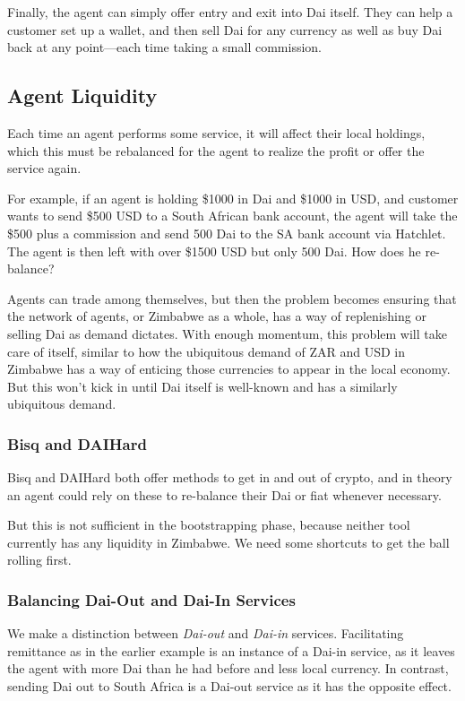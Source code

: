 \documentclass{article}
\begin{document}
Finally, the agent can simply offer entry and exit into Dai itself. They can help a customer set up a wallet, and then sell Dai for any currency as well as buy Dai back at any point---each time taking a small commission.

\subsection{Agent Liquidity} \label{liquidity}

Each time an agent performs some service, it will affect their local holdings, which this must be rebalanced for the agent to realize the profit or offer the service again.

For example, if an agent is holding \$1000 in Dai and \$1000 in USD, and customer wants to send \$500 USD to a South African bank account, the agent will take the \$500 plus a commission and send 500 Dai to the SA bank account via Hatchlet. The agent is then left with over \$1500 USD but only 500 Dai. How does he re-balance?

Agents can trade among themselves, but then the problem becomes ensuring that the network of agents, or Zimbabwe as a whole, has a way of replenishing or selling Dai as demand dictates. With enough momentum, this problem will take care of itself, similar to how the ubiquitous demand of ZAR and USD in Zimbabwe has a way of enticing those currencies to appear in the local economy. But this won't kick in until Dai itself is well-known and has a similarly ubiquitous demand.

\subsubsection{Bisq and DAIHard} \label{exchanges insufficient}

Bisq and DAIHard both offer methods to get in and out of crypto, and in theory an agent could rely on these to re-balance their Dai or fiat whenever necessary.

But this is not sufficient in the bootstrapping phase, because neither tool currently has any liquidity in Zimbabwe. We need some shortcuts to get the ball rolling first.

\subsubsection{Balancing Dai-Out and Dai-In Services} \label{dai-out dai-in}

We make a distinction between \textit{Dai-out} and \textit{Dai-in} services. Facilitating remittance as in the earlier example is an instance of a Dai-in service, as it leaves the agent with more Dai than he had before and less local currency. In contrast, sending Dai out to South Africa is a Dai-out service as it has the opposite effect.
\end{document}
